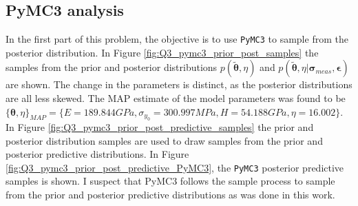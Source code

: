 \documentclass{article}
\begin{document}
	\subsection{PyMC3 analysis}
	In the first part of this problem, the objective is to use \texttt{PyMC3} to sample from the posterior distribution. In Figure \ref{fig:Q3_pymc3_prior_post_samples} the samples from the prior and posterior distributions $p(\tilde{\boldsymbol\theta}, \eta)$ and $p(\tilde{\boldsymbol\theta}, \eta \vert \boldsymbol\sigma_{meas}, \boldsymbol\epsilon)$ are shown. The change in the parameters is distinct, as the posterior distributions are all less skewed. The MAP estimate of the model parameters was found to be $\{\boldsymbol\theta, \eta \}_{MAP} = \{E = 189.844 GPa, \sigma_{y_0} = 300.997MPa, H = 54.188GPa, \eta = 16.002  \}$. In Figure \ref{fig:Q3_pymc3_prior_post_predictive_samples} the prior and posterior distribution samples are used to draw samples from the prior and posterior predictive distributions. In Figure \ref{fig:Q3_pymc3_prior_post_predictive_PyMC3}, the \texttt{PyMC3} posterior predictive samples is shown. I suspect that PyMC3 follows the sample process to sample from the prior and posterior predictive distributions as was done in this work.
\end{document}
